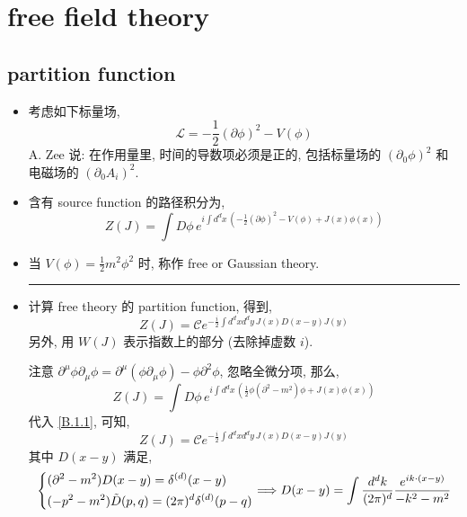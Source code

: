 \chapter{free field theory}
\section{partition function}
\begin{itemize}
	\item 考虑如下标量场,
	\begin{equation}
		\mathcal{L} = - \frac{1}{2} (\partial \phi)^2 - V(\phi)
	\end{equation}
	A. Zee 说: 在作用量里, 时间的导数项必须是正的, 包括标量场的 $(\partial_0 \phi)^2$ 和电磁场的 $(\partial_0 A_i)^2$.
	
	\item 含有 source function 的路径积分为,
	\begin{equation}
		Z(J) = \int D\phi \, e^{i \int d^d x \, (- \frac{1}{2} (\partial \phi)^2 - V(\phi) + J(x) \phi(x))}
	\end{equation}
	
	\item 当 $V(\phi) = \frac{1}{2} m^2 \phi^2$ 时, 称作 free or Gaussian theory.
	
	\noindent\rule[0.5ex]{\linewidth}{0.5pt} %
	
	\item 计算 free theory 的 partition function, 得到,
	\begin{equation} \label{1.1.3}
		Z(J) = \mathcal{C} e^{- \frac{i}{2} \int d^d x d^d y \, J(x) D(x - y) J(y)}
	\end{equation}
	另外, 用 $W(J)$ 表示指数上的部分 (去除掉虚数 $i$).
	
	\begin{tcolorbox}[title=proof:]
		注意 $\partial^\mu \phi \partial_\mu \phi = \partial^\mu(\phi \partial_\mu \phi) - \phi \partial^2 \phi$, 忽略全微分项, 那么,
		\begin{equation} \label{1.1.4}
			Z(J) = \int D\phi \, e^{i \int d^d x \, (\frac{1}{2} \phi (\partial^2 - m^2) \phi + J(x) \phi(x))}
		\end{equation}
		代入 \eqref{B.1.1}, 可知,
		\begin{equation}
			Z(J) = \mathcal{C} e^{- \frac{i}{2} \int d^d x d^d y \, J(x) D(x - y) J(y)}
		\end{equation}
		其中 $D(x - y)$ 满足,
		\begin{equation} \label{1.1.6}
			\begin{dcases}
				(\partial^2 - m^2) D(x - y) = \delta^{(d)}(x - y) \\
				(- p^2 - m^2) \tilde{D}(p, q) = (2 \pi)^d \delta^{(d)}(p - q)
			\end{dcases} \Longrightarrow D(x - y) = \int \frac{d^d k}{(2 \pi)^d} \frac{e^{i k \cdot (x - y)}}{- k^2 - m^2}
		\end{equation}
	\end{tcolorbox}
\end{itemize}

